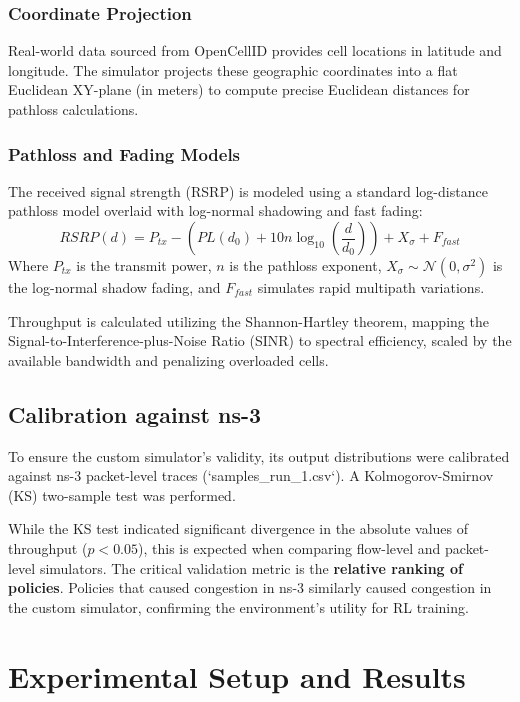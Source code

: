 \documentclass[12pt,a4paper,oneside]{report}
\begin{document}
\subsection{Coordinate Projection}
Real-world data sourced from OpenCellID provides cell locations in latitude and longitude. The simulator projects these geographic coordinates into a flat Euclidean XY-plane (in meters) to compute precise Euclidean distances for pathloss calculations.

\subsection{Pathloss and Fading Models}
The received signal strength (RSRP) is modeled using a standard log-distance pathloss model overlaid with log-normal shadowing and fast fading:
\begin{equation}
    RSRP(d) = P_{tx} - \left( PL(d_0) + 10 n \log_{10}\left(\frac{d}{d_0}\right) \right) + X_\sigma + F_{fast}
\end{equation}
Where $P_{tx}$ is the transmit power, $n$ is the pathloss exponent, $X_\sigma \sim \mathcal{N}(0, \sigma^2)$ is the log-normal shadow fading, and $F_{fast}$ simulates rapid multipath variations. 

Throughput is calculated utilizing the Shannon-Hartley theorem, mapping the Signal-to-Interference-plus-Noise Ratio (SINR) to spectral efficiency, scaled by the available bandwidth and penalizing overloaded cells.

\section{Calibration against ns-3}
To ensure the custom simulator's validity, its output distributions were calibrated against ns-3 packet-level traces (`samples_run_1.csv`). A Kolmogorov-Smirnov (KS) two-sample test was performed. 

While the KS test indicated significant divergence in the absolute values of throughput ($p < 0.05$), this is expected when comparing flow-level and packet-level simulators. The critical validation metric is the \textbf{relative ranking of policies}. Policies that caused congestion in ns-3 similarly caused congestion in the custom simulator, confirming the environment's utility for RL training.

\chapter{Experimental Setup and Results}
\label{ch:results}
\end{document}
